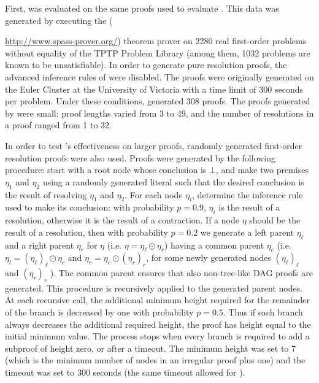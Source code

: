 First, {\FORPI} was evaluated on the same proofs used to evaluate {\GFOLU}. This data was generated by executing the {\SPASS} ({\url{http://www.spass-prover.org/}) theorem prover on 2280 real first-order problems without equality of the TPTP Problem Library (among them, 1032 problems are known to be unsatisfiable). In order to generate pure resolution proofs, the advanced inference rules of {\SPASS} were disabled. The proofs were originally generated on the Euler Cluster at the University of Victoria with a time limit of 300 seconds per problem. Under these conditions, {\SPASS} generated 308 proofs. The proofs generated by {\SPASS} were small: proof lengths varied from 3 to 49, and the number of resolutions in a proof ranged from 1 to 32.


In order to test {\FORPI}'s effectiveness on larger proofs, randomly generated first-order resolution proofs were also used.
Proofs were generated by the following procedure: start with a root node whose conclusion is $\bot$, and make two premises $\eta_1$ and $\eta_2$ using a randomly generated literal such that the desired conclusion is the result of resolving $\eta_1$ and $\eta_2$. For each node $\eta_i$, determine the inference rule used to make its conclusion: with probability $p=0.9$, $\eta_i$ is the result of a resolution, otherwise it is the result of a contraction.
If a node $\eta$ should be the result of a resolution, then with probability $p=0.2$ we generate a left parent $\eta_\ell$ and a right parent $\eta_r$ for $\eta$ (i.e. $\eta = \eta_\ell \odot \eta_r$) having a common parent $\eta_c$ (i.e. $\eta_l = (\eta_\ell)_\ell \odot \eta_c$ and $\eta_r = \eta_c \odot (\eta_r)_r$, for some newly generated nodes $(\eta_\ell)_\ell$ and $(\eta_r)_r$ ). The common parent ensures that also non-tree-like DAG proofs are generated. This procedure is recursively applied to the generated parent nodes. At each recursive call, the additional minimum height required for the remainder of the branch is decreased by one with probability $p=0.5$. Thus if each branch always decreases the additional required height, the proof has height equal to the initial minimum value. The process stops when every branch is required to add a subproof of height zero, or after a timeout. The minimum height was set to 7 (which is the minimum number of nodes in an irregular proof plus one) and the timeout was set to 300 seconds (the same timeout allowed for {\SPASS}).


}

